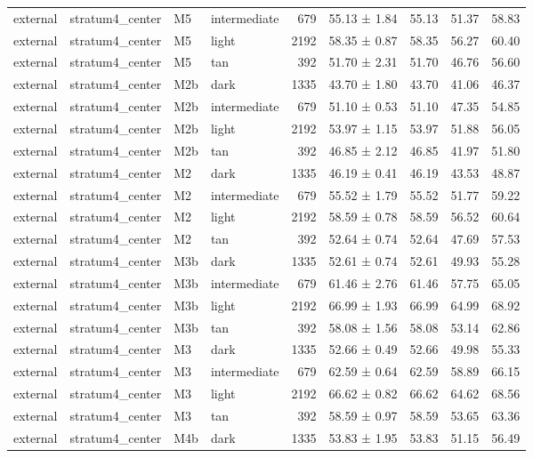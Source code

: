 \begin{tabular}{llllrlrrr}
external & stratum4\_center & M5 & intermediate & 679 & 55.13 ± 1.84 & 55.13 & 51.37 & 58.83 \\
external & stratum4\_center & M5 & light & 2192 & 58.35 ± 0.87 & 58.35 & 56.27 & 60.40 \\
external & stratum4\_center & M5 & tan & 392 & 51.70 ± 2.31 & 51.70 & 46.76 & 56.60 \\
external & stratum4\_center & M2b & dark & 1335 & 43.70 ± 1.80 & 43.70 & 41.06 & 46.37 \\
external & stratum4\_center & M2b & intermediate & 679 & 51.10 ± 0.53 & 51.10 & 47.35 & 54.85 \\
external & stratum4\_center & M2b & light & 2192 & 53.97 ± 1.15 & 53.97 & 51.88 & 56.05 \\
external & stratum4\_center & M2b & tan & 392 & 46.85 ± 2.12 & 46.85 & 41.97 & 51.80 \\
external & stratum4\_center & M2 & dark & 1335 & 46.19 ± 0.41 & 46.19 & 43.53 & 48.87 \\
external & stratum4\_center & M2 & intermediate & 679 & 55.52 ± 1.79 & 55.52 & 51.77 & 59.22 \\
external & stratum4\_center & M2 & light & 2192 & 58.59 ± 0.78 & 58.59 & 56.52 & 60.64 \\
external & stratum4\_center & M2 & tan & 392 & 52.64 ± 0.74 & 52.64 & 47.69 & 57.53 \\
external & stratum4\_center & M3b & dark & 1335 & 52.61 ± 0.74 & 52.61 & 49.93 & 55.28 \\
external & stratum4\_center & M3b & intermediate & 679 & 61.46 ± 2.76 & 61.46 & 57.75 & 65.05 \\
external & stratum4\_center & M3b & light & 2192 & 66.99 ± 1.93 & 66.99 & 64.99 & 68.92 \\
external & stratum4\_center & M3b & tan & 392 & 58.08 ± 1.56 & 58.08 & 53.14 & 62.86 \\
external & stratum4\_center & M3 & dark & 1335 & 52.66 ± 0.49 & 52.66 & 49.98 & 55.33 \\
external & stratum4\_center & M3 & intermediate & 679 & 62.59 ± 0.64 & 62.59 & 58.89 & 66.15 \\
external & stratum4\_center & M3 & light & 2192 & 66.62 ± 0.82 & 66.62 & 64.62 & 68.56 \\
external & stratum4\_center & M3 & tan & 392 & 58.59 ± 0.97 & 58.59 & 53.65 & 63.36 \\
external & stratum4\_center & M4b & dark & 1335 & 53.83 ± 1.95 & 53.83 & 51.15 & 56.49 \\

\end{tabular}
